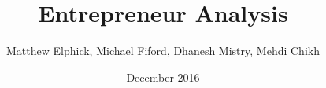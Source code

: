 \geometry{margin=25mm}
\pagestyle{fancy}
\fancyhf{}
\cfoot{\thepage}

\title{Entrepreneur Analysis}
\author{Matthew Elphick, Michael Fiford, Dhanesh Mistry, Mehdi Chikh}
\date{December 2016}